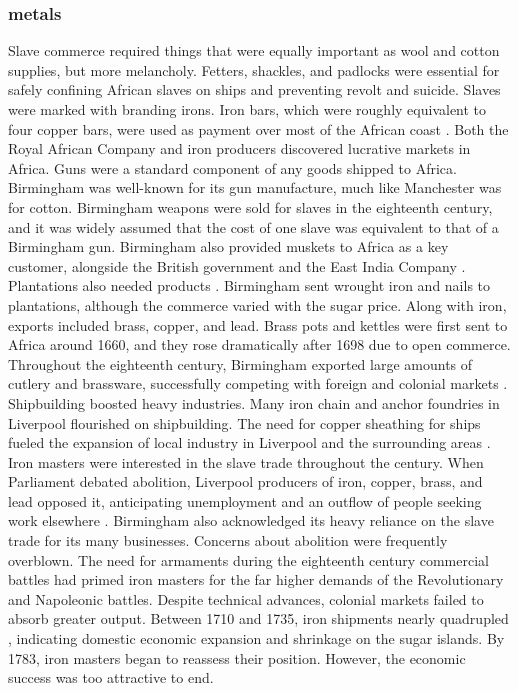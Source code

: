 \subsubsection{metals}
Slave commerce required things that were equally important as wool and cotton supplies, but more melancholy. Fetters, shackles, and padlocks were essential for safely confining African slaves on ships and preventing revolt and suicide. Slaves were marked with branding irons. Iron bars, which were roughly equivalent to four copper bars, were used as payment over most of the African coast . Both the Royal African Company and iron producers discovered lucrative markets in Africa. Guns were a standard component of any goods shipped to Africa. Birmingham was well-known for its gun manufacture, much like Manchester was for cotton. Birmingham weapons were sold for slaves in the eighteenth century, and it was widely assumed that the cost of one slave was equivalent to that of a Birmingham gun. Birmingham also provided muskets to Africa as a key customer, alongside the British government and the East India Company . Plantations also needed products . Birmingham sent wrought iron and nails to plantations, although the commerce varied with the sugar price. Along with iron, exports included brass, copper, and lead. Brass pots and kettles were first sent to Africa around 1660, and they rose dramatically after 1698 due to open commerce. Throughout the eighteenth century, Birmingham exported large amounts of cutlery and brassware, successfully competing with foreign and colonial markets . Shipbuilding boosted heavy industries. Many iron chain and anchor foundries in Liverpool flourished on shipbuilding. The need for copper sheathing for ships fueled the expansion of local industry in Liverpool and the surrounding areas . Iron masters were interested in the slave trade throughout the century. When Parliament debated abolition, Liverpool producers of iron, copper, brass, and lead opposed it, anticipating unemployment and an outflow of people seeking work elsewhere . Birmingham also acknowledged its heavy reliance on the slave trade for its many businesses. Concerns about abolition  were frequently overblown. The need for armaments during the eighteenth century commercial battles had primed iron masters for the far higher demands of the Revolutionary and Napoleonic battles. Despite technical advances, colonial markets failed to absorb greater output. Between 1710 and 1735, iron shipments nearly quadrupled , indicating domestic economic expansion and shrinkage on the sugar islands. By 1783, iron masters began to reassess their position. However, the economic success was too attractive to end.
